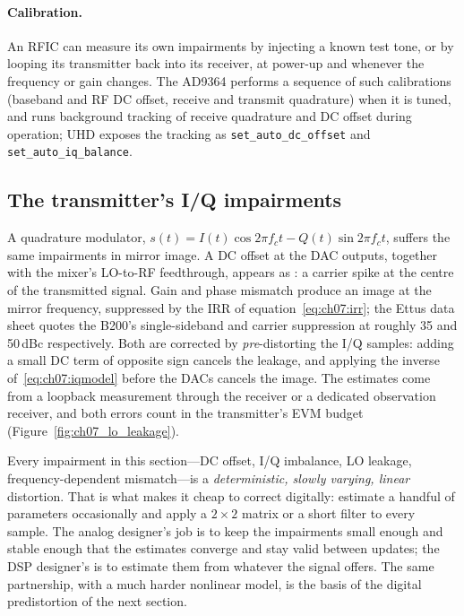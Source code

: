 
\paragraph{Calibration.} An RFIC can measure its own impairments by injecting a known test tone, or by
looping its transmitter back into its receiver, at power-up and whenever the frequency or gain changes.
The AD9364 performs a sequence of such calibrations (baseband and RF DC offset, receive and transmit
quadrature) when it is tuned, and runs background tracking of receive quadrature and DC offset during
operation; UHD exposes the tracking as \texttt{set\_auto\_dc\_offset} and \texttt{set\_auto\_iq\_balance}.

\subsection{The transmitter's I/Q impairments}

A quadrature modulator, $s(t)=I(t)\cos2\pi f_ct-Q(t)\sin2\pi f_ct$, suffers the same impairments in
mirror image. A DC offset at the DAC outputs, together with the mixer's LO-to-RF feedthrough, appears as
: a carrier spike at the centre of the transmitted signal. Gain and phase mismatch
produce an image at the mirror frequency, suppressed by the IRR of equation~\eqref{eq:ch07:irr}; the
Ettus data sheet quotes the B200's single-sideband and carrier suppression at roughly 35 and 50\,dBc
respectively. Both are corrected by \emph{pre}-distorting the I/Q samples: adding a small DC term of
opposite sign cancels the leakage, and applying the inverse of~\eqref{eq:ch07:iqmodel} before the DACs
cancels the image. The estimates come from a loopback measurement through the receiver or a dedicated
observation receiver, and both errors count in the transmitter's EVM budget
(Figure~\ref{fig:ch07_lo_leakage}).

\begin{keyidea}
Every impairment in this section---DC offset, I/Q imbalance, LO leakage, frequency-dependent
mismatch---is a \emph{deterministic, slowly varying, linear} distortion. That is what makes it cheap to
correct digitally: estimate a handful of parameters occasionally and apply a $2\times2$ matrix or a short
filter to every sample. The analog designer's job is to keep the impairments small enough and stable
enough that the estimates converge and stay valid between updates; the DSP designer's is to estimate
them from whatever the signal offers. The same partnership, with a much harder nonlinear model, is the
basis of the digital predistortion of the next section.
\end{keyidea}


